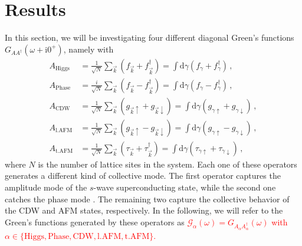 \documentclass[
    reprint, 
    aps,
    preprintnumbers,
    twocolumn,
    prb,
    superscriptaddress
]{revtex4-2}
\newcommand{\vk}{\vec{k}}
\newcommand{\up}{\uparrow}
\newcommand{\down}{\downarrow}
\newcommand{\im}{\mathrm{i}}
\newcommand{\dgamma}{\mathrm{d}\gamma}
\newcommand{\markEdited}{red}
\begin{document}


\section{Results}\label{sec:results}

In this section, we will be investigating four different diagonal Green's functions $G_{AA^\dagger}(\omega + \im 0^+)$, namely with
\begin{subequations}
    \label{eqn:resolvent_bases}
    \begin{align}
        A_\text{Higgs} &= \frac{1}{\sqrt{N}} \sum_{\vk} \left( f_{\vk} + f_{\vk}^\dagger \right)  
            = \int \dgamma \left( f_{\gamma} + f_{\gamma}^\dagger \right) \,,\\
        A_\text{Phase} &= \frac{i}{\sqrt{N}} \sum_{\vk} \left( f_{\vk} - f_{\vk}^\dagger \right) = \int \dgamma \left( f_{\gamma} - f_{\gamma}^\dagger \right) \,,\\
        A_\text{CDW}   &= \frac{1}{\sqrt{N}} \sum_{\vk} \left( g_{\vk \up} + g_{\vk \down} \right) = \int \dgamma \left( g_{\gamma \up} + g_{\gamma \down} \right) \,,\\
        A_\text{l.AFM}   &= \frac{1}{\sqrt{N}} \sum_{\vk} \left( g_{\vk \up} - g_{\vk \down} \right) = \int \dgamma \left( g_{\gamma \up} - g_{\gamma \down} \right) \,, \\
        A_\text{t.AFM}   &= \frac{1}{\sqrt{N}} \sum_{\vk} \left( \tau_{\vk} + \tau_{\vk}^\dagger \right) = \int \dgamma \left( \tau_{\gamma \up} + \tau_{\gamma \down} \right) \,,
    \end{align}
\end{subequations}
where $N$ is the number of lattice sites in the system. 
Each one of these operators generates a different kind of collective mode.
The first operator captures the amplitude mode of the $s$-wave superconducting state, while the second one catches the phase mode \cite{Fan22}.
The remaining two capture the collective behavior of the CDW and AFM states, respectively.
In the following, we will refer to the Green's functions generated by these operators as \textcolor{\markEdited}{$\mathcal{G}_{\alpha}(\omega) = G_{A_\alpha A_\alpha^\dagger}(\omega)$ 
with $\alpha \in \{ \text{Higgs}, \text{Phase}, \text{CDW}, \text{l.AFM}, \text{t.AFM} \}$.}
\end{document}
